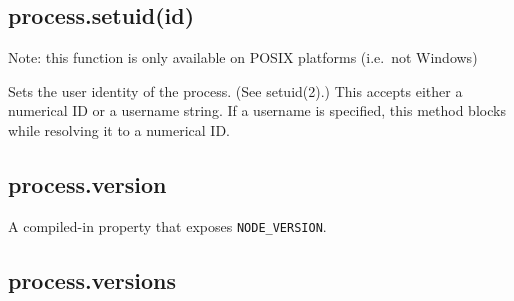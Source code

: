 \subsection{process.setuid(id)}

Note: this function is only available on POSIX platforms (i.e.~not
Windows)

Sets the user identity of the process. (See setuid(2).) This accepts
either a numerical ID or a username string. If a username is specified,
this method blocks while resolving it to a numerical ID.

\begin{Shaded}
\begin{Highlighting}[]
 \NormalTok{(} \NormalTok{&& }\NormalTok{) \{}
  \NormalTok{(} \NormalTok{+ }\NormalTok{());}
   \NormalTok{\{}
    \NormalTok{(}\NormalTok{);}
    \NormalTok{(} \NormalTok{+ }\NormalTok{());}
  \NormalTok{\}}
   
    \NormalTok{(} 
  \NormalTok{\}}
\NormalTok{\}}
\end{Highlighting}
\end{Shaded}

\subsection{process.version}

A compiled-in property that exposes \texttt{NODE\_VERSION}.

\begin{Shaded}
\begin{Highlighting}[]
\NormalTok{(} \NormalTok{+ }\NormalTok{);}
\end{Highlighting}
\end{Shaded}

\subsection{process.versions}

